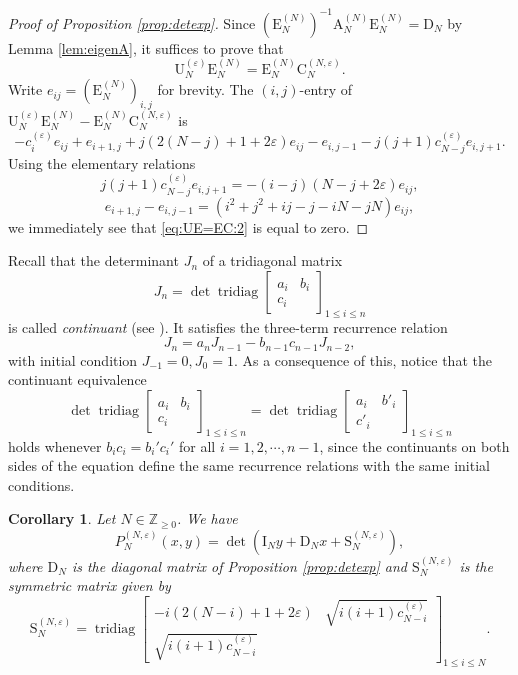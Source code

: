 \documentclass[11pt]{article}
\numberwithin{equation}{section}
\newcommand{\Z}{\mathbb{Z}} %
\newcommand{\e}{\varepsilon}
\newcommand{\cp}[2]{P^{(#1)}_{#2}} %
\DeclareMathOperator{\tridiag}{tridiag}
\newcommand{\Tridiag}[4]{\tridiag\mat{#1 & #2 \\ #3}_{#4}}
\newcommand{\mat}[1]{\begin{bmatrix}#1\end{bmatrix}}
\newcommand{\MatSymbol}[1]{\bm{\mathrm{#1}}}
\newcommand{\mA}{\MatSymbol{A}}
\newcommand{\mC}{\MatSymbol{C}}
\newcommand{\mD}{\MatSymbol{D}}
\newcommand{\mE}{\MatSymbol{E}}
\newcommand{\mI}{\MatSymbol{I}}
\newcommand{\mS}{\MatSymbol{S}}
\newcommand{\mU}{\MatSymbol{U}}
\theoremstyle{plain}
\newtheorem{cor}[thm]{Corollary}
\theoremstyle{definition}
\theoremstyle{remark}
\begin{document}
\begin{proof}[Proof of Proposition \ref{prop:detexp}]
  Since \((\mE^{(N)}_N)^{-1} \mA_{N}^{(N)} \mE^{(N)}_N = \mD_N \) by Lemma \ref{lem:eigenA},
  it suffices to prove that
  \begin{equation}
    \label{eq:UE=EC}
    \mU^{(\e)}_N \mE^{(N)}_N = \mE^{(N)}_N \mC^{(N,\e)}_N.
  \end{equation}
  Write $e_{ij}=(\mE^{(N)}_N)_{i,j}$ for brevity.
  The $(i,j)$-entry of $\mU^{(\e)}_N \mE^{(N)}_N-\mE^{(N)}_N \mC^{(N,\e)}_N$ is
  \begin{equation}\label{eq:UE=EC:2}
    -c^{(\e)}_ie_{ij}+e_{i+1,j}
    +j(2(N-j)+1+2\e)e_{ij}-e_{i,j-1}-j(j+1)c^{(\e)}_{N-j}e_{i,j+1}.
  \end{equation}
  Using the elementary relations
  \begin{equation*}
    j(j+1)c^{(\e)}_{N-j}e_{i,j+1}=-(i-j)(N-j+2\e)e_{ij},
  \end{equation*}
  \begin{equation*}
  e_{i+1,j}-e_{i,j-1}=(i^2+j^2+ij-j-iN-jN)e_{ij},
  \end{equation*}
  we immediately see that \eqref{eq:UE=EC:2} is equal to zero.
\end{proof}

Recall that the determinant \(J_n\) of a tridiagonal matrix
\begin{equation*}
  J_n=\det\Tridiag{a_i}{b_i}{c_i}{1\le i\le n}
\end{equation*}
is called {\em continuant} (see \cite{Muir1960}). It satisfies the
three-term recurrence relation
\begin{equation} \label{eq:continuant}
    J_n = a_{n} J_{n-1} - b_{n-1} c_{n-1} J_{n-2},
\end{equation}
with initial condition \(J_{-1} = 0 , J_0 = 1 \).
As a consequence of this, notice that the continuant equivalence
\begin{equation}
  \label{eq:propCont1}
  \det\Tridiag{a_i}{b_i}{c_i}{1\le i\le n} =\det\Tridiag{a_i}{b'_i}{c'_i}{1\le i\le n}
\end{equation}
holds whenever \(b_i c_i = b_i' c_i'\) for all \(i=1,2,\cdots,n-1 \), since the continuants on both sides of the equation define the same
recurrence relations with the same initial conditions.

\begin{cor}
  \label{cor:detsym}
  Let \( N \in \Z_{\geq 0}\). We have
  \[
    \cp{N,\e}{N}(x,y) = \det\left( \mI_N y + \mD_N x + \mS_N^{(N,\e)} \right),
  \]
  where \(\mD_N\) is the diagonal matrix of Proposition \ref{prop:detexp} and \(\mS_N^{(N,\e)}\)
  is the symmetric matrix given by
  \[
    \mS_N^{(N,\e)} = \Tridiag{-i(2(N-i)+1+2\e)}{\sqrt{i(i+1)c^{(\e)}_{N-i}}}{\sqrt{i(i+1)c^{(\e)}_{N-i}}}{1\le i\le N}.
  \]
\end{cor}
\end{document}
